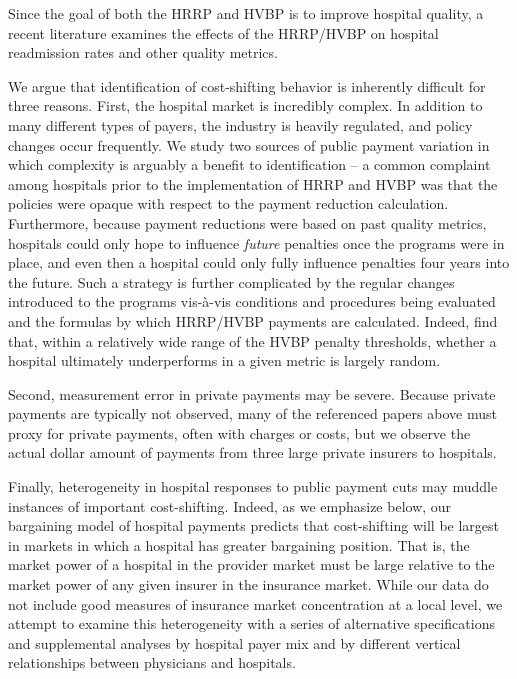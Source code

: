 \documentclass[12pt]{article}
\begin{document}
Since the goal of both the HRRP and HVBP is to improve hospital quality, a recent literature examines the effects of the HRRP/HVBP on hospital readmission rates and other quality metrics.








We argue that identification of cost-shifting behavior is inherently difficult for three reasons.  First, the hospital market is incredibly complex.  In addition to many different types of payers, the industry is heavily regulated, and policy changes occur frequently.  We study two sources of public payment variation in which complexity is arguably a benefit to identification -- a common complaint among hospitals prior to the implementation of HRRP and HVBP was that the policies were opaque with respect to the payment reduction calculation.  Furthermore, because payment reductions were based on past quality metrics, hospitals could only hope to influence \textit{future} penalties once the programs were in place, and even then a hospital could only fully influence penalties four years into the future. Such a strategy is further complicated by the regular changes introduced to the programs vis-\`a-vis conditions and procedures being evaluated and the formulas by which HRRP/HVBP payments are calculated. Indeed, \cite{friedson2016} find that, within a relatively wide range of the HVBP penalty thresholds, whether a hospital ultimately underperforms in a given metric is largely random.

Second, measurement error in private payments may be severe. Because private payments are typically not observed, many of the referenced papers above must proxy for private payments, often with charges or costs, but we observe the actual dollar amount of payments from three large private insurers to hospitals.

Finally, heterogeneity in hospital responses to public payment cuts may muddle instances of important cost-shifting. Indeed, as we emphasize below, our bargaining model of hospital payments predicts that cost-shifting will be largest in markets in which a hospital has greater bargaining position. That is, the market power of a hospital in the provider market must be large relative to the market power of any given insurer in the insurance market.  While our data do not include good measures of insurance market concentration at a local level, we attempt to examine this heterogeneity with a series of alternative specifications and supplemental analyses by hospital payer mix and by different vertical relationships between physicians and hospitals.
\end{document}
